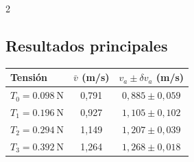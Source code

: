 \documentclass[10pt,a4paper]{article}
\begin{document}
\begin{multicols}{2}
\subsection*{Resultados principales}
\begin{center}
  \small
  \begin{tabular}{lcc}
    \toprule
    Tensión & $\bar{v}$ (m/s) & $v_a \pm \delta v_a$ (m/s) \\
    \midrule
    $T_0 = \SI{0.098}{\N}$ & 0,791 & $0{,}885\pm0{,}059$ \\
    $T_1 = \SI{0.196}{\N}$ & 0,927 & $1{,}105\pm0{,}102$ \\
    $T_2 = \SI{0.294}{\N}$ & 1,149 & $1{,}207\pm0{,}039$ \\
    $T_3 = \SI{0.392}{\N}$ & 1,264 & $1{,}268\pm0{,}018$ \\
    \bottomrule
  \end{tabular}
\end{center}

\end{multicols}
\end{document}
